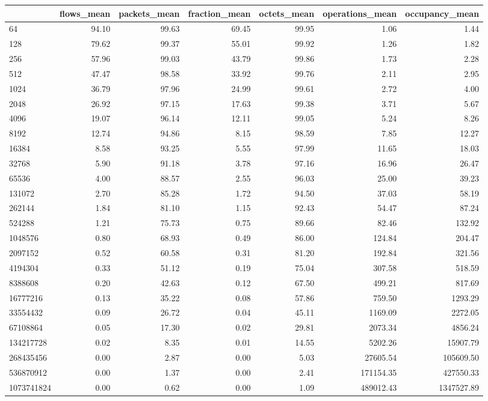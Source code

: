 \begin{tabular}{lrrrrrr}
\toprule
 & flows_mean & packets_mean & fraction_mean & octets_mean & operations_mean & occupancy_mean \\
\midrule
64 & 94.10 & 99.63 & 69.45 & 99.95 & 1.06 & 1.44 \\
128 & 79.62 & 99.37 & 55.01 & 99.92 & 1.26 & 1.82 \\
256 & 57.96 & 99.03 & 43.79 & 99.86 & 1.73 & 2.28 \\
512 & 47.47 & 98.58 & 33.92 & 99.76 & 2.11 & 2.95 \\
1024 & 36.79 & 97.96 & 24.99 & 99.61 & 2.72 & 4.00 \\
2048 & 26.92 & 97.15 & 17.63 & 99.38 & 3.71 & 5.67 \\
4096 & 19.07 & 96.14 & 12.11 & 99.05 & 5.24 & 8.26 \\
8192 & 12.74 & 94.86 & 8.15 & 98.59 & 7.85 & 12.27 \\
16384 & 8.58 & 93.25 & 5.55 & 97.99 & 11.65 & 18.03 \\
32768 & 5.90 & 91.18 & 3.78 & 97.16 & 16.96 & 26.47 \\
65536 & 4.00 & 88.57 & 2.55 & 96.03 & 25.00 & 39.23 \\
131072 & 2.70 & 85.28 & 1.72 & 94.50 & 37.03 & 58.19 \\
262144 & 1.84 & 81.10 & 1.15 & 92.43 & 54.47 & 87.24 \\
524288 & 1.21 & 75.73 & 0.75 & 89.66 & 82.46 & 132.92 \\
1048576 & 0.80 & 68.93 & 0.49 & 86.00 & 124.84 & 204.47 \\
2097152 & 0.52 & 60.58 & 0.31 & 81.20 & 192.84 & 321.56 \\
4194304 & 0.33 & 51.12 & 0.19 & 75.04 & 307.58 & 518.59 \\
8388608 & 0.20 & 42.63 & 0.12 & 67.50 & 499.21 & 817.69 \\
16777216 & 0.13 & 35.22 & 0.08 & 57.86 & 759.50 & 1293.29 \\
33554432 & 0.09 & 26.72 & 0.04 & 45.11 & 1169.09 & 2272.05 \\
67108864 & 0.05 & 17.30 & 0.02 & 29.81 & 2073.34 & 4856.24 \\
134217728 & 0.02 & 8.35 & 0.01 & 14.55 & 5202.26 & 15907.79 \\
268435456 & 0.00 & 2.87 & 0.00 & 5.03 & 27605.54 & 105609.50 \\
536870912 & 0.00 & 1.37 & 0.00 & 2.41 & 171154.35 & 427550.33 \\
1073741824 & 0.00 & 0.62 & 0.00 & 1.09 & 489012.43 & 1347527.89 \\
\bottomrule
\end{tabular}
